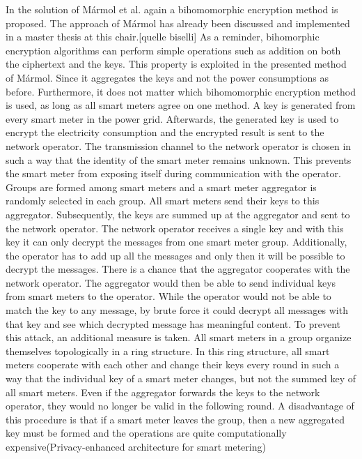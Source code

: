 In the solution of Mármol et al. again a bihomomorphic encryption method is proposed. The approach of Mármol has already been discussed and implemented in a master thesis at this chair.[quelle biselli] As a reminder, bihomorphic encryption algorithms can perform simple operations such as addition on both the ciphertext and the keys. This property is exploited in the presented method of Mármol. Since it aggregates the keys and not the power consumptions as before. Furthermore, it does not matter which bihomomorphic encryption method is used, as long as all smart meters agree on one method. A key is generated from every smart meter in the power grid. Afterwards, the generated key is used to encrypt the electricity consumption and the encrypted result is sent to the network operator. The transmission channel to the network operator is chosen in such a way that the identity of the smart meter remains unknown. This prevents the smart meter from exposing itself during communication with the operator. Groups are formed among smart meters and a smart meter aggregator is randomly selected in each group. All smart meters send their keys to this aggregator. Subsequently, the keys are summed up at the aggregator and sent to the network operator. The network operator receives a single key and with this key it can only decrypt the messages from one smart meter group. Additionally, the operator has to add up all the messages and only then it will be possible to decrypt the messages. There is a chance that the aggregator cooperates with the network operator. The aggregator would then be able to send individual keys from smart meters to the operator. While the operator would not be able to match the key to any message, by brute force it could decrypt all messages with that key and see which decrypted message has meaningful content. To prevent this attack, an additional measure is taken. All smart meters in a group organize themselves topologically in a ring structure. In this ring structure, all smart meters cooperate with each other and change their keys every round in such a way that the individual key of a smart meter changes, but not the summed key of all smart meters. Even if the aggregator forwards the keys to the network operator, they would no longer be valid in the following round. A disadvantage of this procedure is that if a smart meter leaves the group, then a new aggregated key must be formed and the operations are quite computationally expensive(Privacy-enhanced architecture for smart metering)\\
\\
